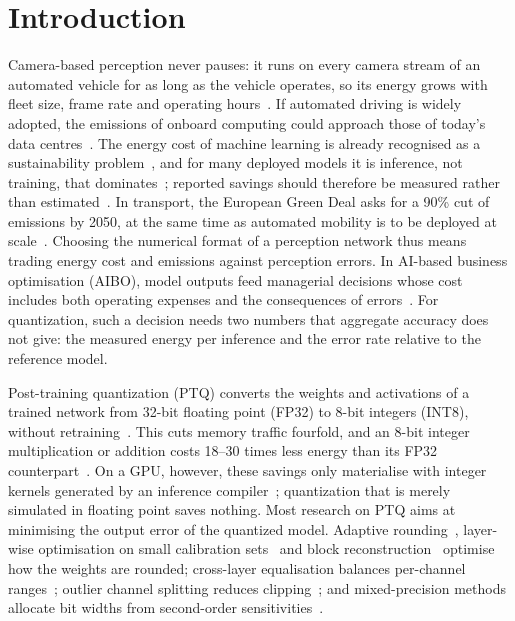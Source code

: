 \documentclass[pdflatex,sn-mathphys-num]{sn-jnl}%
\theoremstyle{thmstyleone}%
\theoremstyle{thmstyletwo}%
\theoremstyle{thmstylethree}%
\begin{document}

\maketitle

\section{Introduction}\label{sec:intro}

Camera-based perception never pauses: it runs on every camera stream of an automated vehicle for as long as the vehicle operates, so its energy grows with fleet size, frame rate and operating hours~\cite{veres2020deep}. If automated driving is widely adopted, the emissions of onboard computing could approach those of today's data centres~\cite{sudhakar2023datacenters}. The energy cost of machine learning is already recognised as a sustainability problem~\cite{strubell2019energy,schwartz2020green,wu2022sustainable,lannelongue2021green}, and for many deployed models it is inference, not training, that dominates~\cite{luccioni2024power,desislavov2023trends}; reported savings should therefore be measured rather than estimated~\cite{henderson2020reporting}. In transport, the European Green Deal asks for a 90\% cut of emissions by 2050, at the same time as automated mobility is to be deployed at scale~\cite{ec2019greendeal,ec2020mobility}. Choosing the numerical format of a perception network thus means trading energy cost and emissions against perception errors. In AI-based business optimisation (AIBO), model outputs feed managerial decisions whose cost includes both operating expenses and the consequences of errors~\cite{duan2019decision}. For quantization, such a decision needs two numbers that aggregate accuracy does not give: the measured energy per inference and the error rate relative to the reference model.

Post-training quantization (PTQ) converts the weights and activations of a trained network from 32-bit floating point (FP32) to 8-bit integers (INT8), without retraining~\cite{jacob2018quantization,krishnamoorthi2018whitepaper,nagel2021whitepaper,gholami2021survey}. This cuts memory traffic fourfold, and an 8-bit integer multiplication or addition costs 18--30 times less energy than its FP32 counterpart~\cite{horowitz2014energy}. On a GPU, however, these savings only materialise with integer kernels generated by an inference compiler~\cite{wu2020integer,tensorrt}; quantization that is merely simulated in floating point saves nothing. Most research on PTQ aims at minimising the output error of the quantized model. Adaptive rounding~\cite{nagel2020adaround}, layer-wise optimisation on small calibration sets~\cite{hubara2021accurate} and block reconstruction~\cite{li2021brecq,wei2022qdrop} optimise how the weights are rounded; cross-layer equalisation balances per-channel ranges~\cite{nagel2019datafree}; outlier channel splitting reduces clipping~\cite{zhao2019ocs}; and mixed-precision methods allocate bit widths from second-order sensitivities~\cite{dong2019hawq,yao2021hawqv3}.
\end{document}
